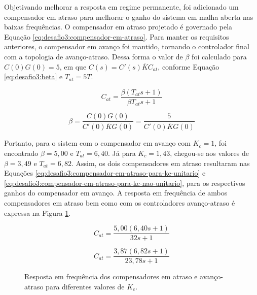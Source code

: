 Objetivando melhorar a resposta em regime permanente, foi adicionado um
compensador em atraso para melhorar o ganho do sistema em malha aberta nas
baixas frequências. O compensador em atraso projetado é governado pela Equação
\ref{eq:desafio3:compensador-em-atraso}. Para manter os requisitos anteriores, o
compensador em avanço foi mantido, tornando o controlador final com a topologia
de avanço-atraso. Dessa forma o valor de $\beta$ foi calculado para $C(0)G(0) =
5$, em que $C(s) = C'(s)\overline{K}C_{at}$, conforme Equação
\ref{eq:desafio3:beta} e $T_{at} = 5T$.

\begin{equation}
    \label{eq:desafio3:compensador-em-atraso}
    C_{at} = \frac{\beta (T_{at}s + 1)}{\beta T_{at}s+1}
\end{equation}

\begin{equation}
    \label{eq:desafio3:beta}
    \beta = \frac{C(0)G(0)}{C'(0)\overline{K}G(0)} = \frac{5}{C'(0)\overline{K}G(0)}
\end{equation}

Portanto, para o sistem com o compensador em avanço com $K_c = 1$, foi
encontrado $\beta = 5,00$ e $T_{at} = 6,40$. Já para $K_c = 1,43$, chegou-se aos
valores de $\beta = 3,49$ e $T_{at} = 6,82$. Assim, os dois compensadores em
atraso resultaram nas Equações
\ref{eq:desafio3:compensador-em-atraso-para-kc-unitario} e
\ref{eq:desafio3:compensador-em-atraso-para-kc-nao-unitario}, para os respectivos
ganhos do compensador em avanço. A resposta em frequência de ambos
compensadores em atraso bem como com os controladores avanço-atraso é expressa na
Figura \ref{fig:desafio-3:resposta-em-frequencia-dos-compensadores}.

\begin{equation}
    \label{eq:desafio3:compensador-em-atraso-para-kc-unitario}
    C_{at} = \frac{5,00 (6,40s + 1)}{32s+1}
\end{equation}

\begin{equation}
    \label{eq:desafio3:compensador-em-atraso-para-kc-nao-unitario}
    C_{at} = \frac{3,87 (6,82s + 1)}{23,78s+1}
\end{equation}

\begin{figure}[ht!]
    \caption{Resposta em frequência dos compensadores em atraso e avanço-atraso
    para diferentes valores de $K_c$.}
    \vspace{-10pt}
    \hspace{-30pt}
    \label{fig:desafio-3:resposta-em-frequencia-dos-compensadores}
    \begin{minipage}{\linewidth}
        
    \end{minipage}
\end{figure}

